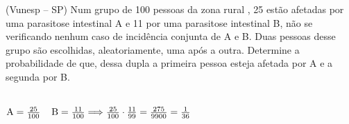 \begin{ex}
(Vunesp – SP) Num grupo de 100 pessoas da zona rural , 25 estão afetadas por uma parasitose intestinal A e 11 por uma parasitose intestinal B, não se verificando nenhum caso de incidência conjunta de A e B. Duas pessoas desse grupo são escolhidas, aleatoriamente, uma após a outra. Determine a probabilidade de que, dessa dupla a primeira pessoa esteja afetada por A e a segunda por B.
 \begin{sol}
   \phantom{A} \\
   $\mathrm{A}=\frac{25}{100}\hspace{0,4cm}\mathrm{B}=\frac{11}{100}\Longrightarrow\frac{25}{100}\cdot\frac{11}{99}=\frac{275}{9900}=\frac{1}{36}$
 \end{sol}
\end{ex}